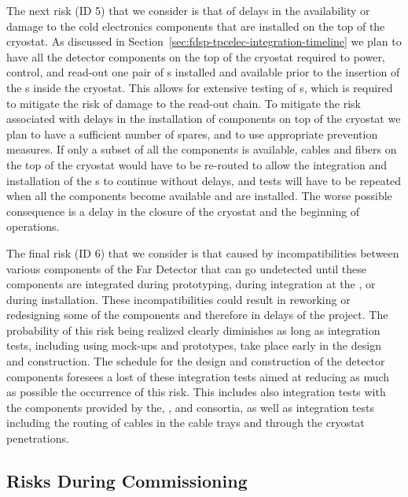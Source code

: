 The next risk (ID 5) that we consider is that of delays in the availability or
damage to the cold electronics components that are installed on the top of the
cryostat. As discussed in Section~\ref{sec:fdsp-tpcelec-integration-timeline}
we plan to have all the  detector components on the top of the cryostat 
required to power, control, and read-out one pair of s installed
and available prior to the insertion of the s inside the cryostat.
This allows for extensive testing of s, which is required to mitigate
the risk of damage to the read-out chain. To mitigate the risk associated with
delays in the installation of  components on top of the cryostat
we plan to have a sufficient number of spares, and to use appropriate  
prevention measures. If only a subset of all the components is available, cables 
and fibers on the top of the cryostat would have to be re-routed to allow the 
integration and installation of the s to continue without delays, 
and tests will have to be repeated when all the components become available 
and are installed. The worse possible consequence is a delay in the closure of 
the cryostat and the beginning of operations. 

The final risk (ID 6) that we consider is that caused by incompatibilities 
between various components of the Far Detector that can go undetected until
these components are integrated during prototyping, during integration at 
the , or during installation. These incompatibilities could 
result in reworking or redesigning some of the components and therefore in
delays of the project. The probability of this risk being realized clearly
diminishes as long as integration tests, including using mock-ups and prototypes,
take place early in the design and construction. The schedule for the 
design and construction of the  detector components foresees a lost of
these integration tests aimed at reducing as much as possible the occurrence
of this risk. This includes also integration tests with the components provided
by the, , and  consortia, as well as integration
tests including the routing of cables in the cable trays and through the cryostat
penetrations. 

\subsection{Risks During Commissioning}
\label{sec:fdsp-tpcelec-risks-commissioning}

